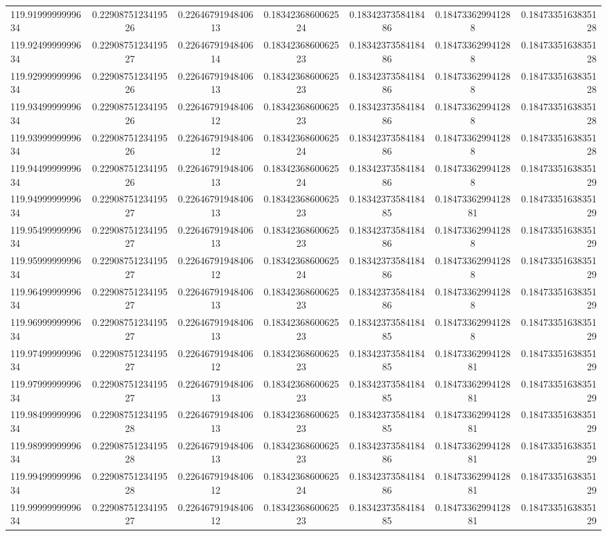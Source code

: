 \begin{tabular}{ l | c | c | c | c | c | r }
119.9199999999634  & 0.2290875123419526  & 0.2264679194840613  & 0.1834236860062524  & 0.1834237358418486  & 0.184733629941288  & 0.1847335163835128 \\
119.9249999999634  & 0.2290875123419527  & 0.2264679194840614  & 0.1834236860062523  & 0.1834237358418486  & 0.184733629941288  & 0.1847335163835128 \\
119.9299999999634  & 0.2290875123419526  & 0.2264679194840613  & 0.1834236860062523  & 0.1834237358418486  & 0.184733629941288  & 0.1847335163835128 \\
119.9349999999634  & 0.2290875123419526  & 0.2264679194840612  & 0.1834236860062523  & 0.1834237358418486  & 0.184733629941288  & 0.1847335163835128 \\
119.9399999999634  & 0.2290875123419526  & 0.2264679194840612  & 0.1834236860062524  & 0.1834237358418486  & 0.184733629941288  & 0.1847335163835128 \\
119.9449999999634  & 0.2290875123419526  & 0.2264679194840613  & 0.1834236860062524  & 0.1834237358418486  & 0.184733629941288  & 0.1847335163835129 \\
119.9499999999634  & 0.2290875123419527  & 0.2264679194840613  & 0.1834236860062523  & 0.1834237358418485  & 0.1847336299412881  & 0.1847335163835129 \\
119.9549999999634  & 0.2290875123419527  & 0.2264679194840613  & 0.1834236860062523  & 0.1834237358418486  & 0.184733629941288  & 0.1847335163835129 \\
119.9599999999634  & 0.2290875123419527  & 0.2264679194840612  & 0.1834236860062524  & 0.1834237358418486  & 0.184733629941288  & 0.1847335163835129 \\
119.9649999999634  & 0.2290875123419527  & 0.2264679194840613  & 0.1834236860062523  & 0.1834237358418486  & 0.184733629941288  & 0.1847335163835129 \\
119.9699999999634  & 0.2290875123419527  & 0.2264679194840613  & 0.1834236860062523  & 0.1834237358418485  & 0.184733629941288  & 0.1847335163835129 \\
119.9749999999634  & 0.2290875123419527  & 0.2264679194840612  & 0.1834236860062523  & 0.1834237358418485  & 0.1847336299412881  & 0.1847335163835129 \\
119.9799999999634  & 0.2290875123419527  & 0.2264679194840613  & 0.1834236860062523  & 0.1834237358418485  & 0.1847336299412881  & 0.1847335163835129 \\
119.9849999999634  & 0.2290875123419528  & 0.2264679194840613  & 0.1834236860062523  & 0.1834237358418485  & 0.1847336299412881  & 0.1847335163835129 \\
119.9899999999634  & 0.2290875123419528  & 0.2264679194840613  & 0.1834236860062523  & 0.1834237358418486  & 0.1847336299412881  & 0.1847335163835129 \\
119.9949999999634  & 0.2290875123419528  & 0.2264679194840612  & 0.1834236860062524  & 0.1834237358418486  & 0.1847336299412881  & 0.1847335163835129 \\
119.9999999999634  & 0.2290875123419527  & 0.2264679194840612  & 0.1834236860062523  & 0.1834237358418485  & 0.1847336299412881  & 0.1847335163835129 \\
\end{tabular}
